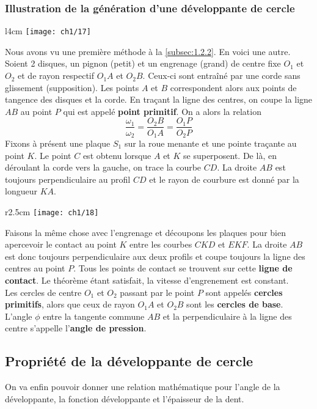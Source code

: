 \subsubsection{Illustration de la génération d'une développante de cercle}
	\begin{wrapfigure}[12]{l}{4cm}
	\vspace{-5mm}
	\texttt{[image: ch1/17]}
	\end{wrapfigure}	
	Nous avons vu une première méthode à la \autoref{subsec:1.2.2}. En voici une autre. Soient 2 disques, un pignon (petit) et un engrenage (grand) de centre fixe $O_1$ et $O_2$ et de rayon respectif $O_1A$ et $O_2B$. Ceux-ci sont entraîné par une corde sans glissement (supposition). Les points $A$ et $B$ correspondent alors aux points de tangence des disques et la corde. En traçant la ligne des centres, on coupe la ligne $AB$ au point $P$ qui est appelé \textbf{point primitif}. On a alors la relation 
	\begin{equation}
		\frac{\omega _1}{\omega _2} = \frac{O_2B}{O_1A} = \frac{O_1P}{O_2P}
	\end{equation}
	Fixons à présent une plaque $S_1$ sur la roue menante et une pointe traçante au point $K$. Le point $C$ est obtenu lorsque $A$ et $K$ se superposent. De là, en déroulant la corde vers la gauche, on trace la courbe $CD$. La droite $AB$ est toujours perpendiculaire au profil $CD$ et le rayon de courbure est donné par la longueur $KA$.	\\
	
	\begin{wrapfigure}[12]{r}{2.5cm}
	\vspace{-5mm}
	\texttt{[image: ch1/18]}
	\end{wrapfigure}	
	Faisons la même chose avec l'engrenage et découpons les plaques pour bien apercevoir le contact au point $K$ entre les courbes $CKD$ et $EKF$. La droite $AB$ est donc toujours perpendiculaire aux deux profils et coupe toujours la ligne des centres au point $P$. Tous les points de contact se trouvent sur cette \textbf{ligne de contact}. Le théorème étant satisfait, la vitesse d'engrenement est constant. \\
	Les cercles de centre $O_1$ et $O_2$ passant par le point $P$ sont appelés \textbf{cercles primitifs}, alors que ceux de rayon $O_1A$ et $O_2B$ sont les \textbf{cercles de base}. L'angle $\phi$ entre la tangente commune $AB$ et la perpendiculaire à la ligne des centre s'appelle l'\textbf{angle de pression}.
	
\subsection{Propriété de la développante de cercle}
	On va enfin pouvoir donner une relation mathématique pour l'angle de la développante, la fonction développante et l'épaisseur de la dent. 
	
